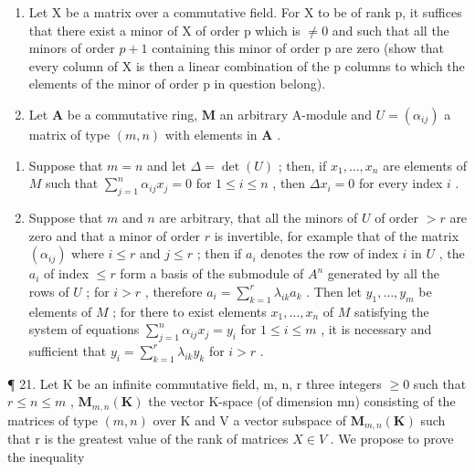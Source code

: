 \begin{enumerate}
\def\labelenumi{\arabic{enumi}.}
\setcounter{enumi}{18}
\item
  Let X be a matrix over a commutative field. For X to be of rank p, it suffices that there exist a minor of X of order p which is \(\neq0\) and such that all the minors of order \(p+1\) containing this minor of order p are zero (show that every column of X is then a linear combination of the p columns to which the elements of the minor of order p in question belong).
\item
  Let \(\mathbf{A}\) be a commutative ring, \(\mathbf{M}\) an arbitrary A-module and \(U = (\alpha_{ij})\) a matrix of type \((m, n)\) with elements in \(\mathbf{A}\) .
\end{enumerate}

\begin{enumerate}
\def\labelenumi{(\alph{enumi})}
\item
  Suppose that \(m = n\) and let \(\Delta = \det(U)\) ; then, if \(x_1, \ldots, x_n\) are elements of \(M\) such that \(\sum_{j=1}^{n} \alpha_{ij} x_j = 0\) for \(1 \leqslant i \leqslant n\) , then \(\Delta x_i = 0\) for every index \(i\) .
\item
  Suppose that \(m\) and \(n\) are arbitrary, that all the minors of \(U\) of order \(> r\) are zero and that a minor of order \(r\) is invertible, for example that of the matrix \((\alpha_{ij})\) where \(i \leqslant r\) and \(j \leqslant r\) ; then if \(a_i\) denotes the row of index \(i\) in \(U\) , the \(a_i\) of index \(\leqslant r\) form a basis of the submodule of \(A^n\) generated by all the rows of \(U\) ; for \(i > r\) , therefore \(a_i = \sum_{k=1}^{r} \lambda_{ik} a_k\) . Then let \(y_1, \ldots, y_m\) be elements of \(M\) ; for there to exist elements \(x_1, \ldots, x_n\) of \(M\) satisfying the system of equations \(\sum_{j=1}^{n} \alpha_{ij} x_j = y_i\) for \(1 \leqslant i \leqslant m\) , it is necessary and sufficient that \(y_i = \sum_{k=1}^{r} \lambda_{ik} y_k\) for \(i > r\) .
\end{enumerate}

¶ 21. Let K be an infinite commutative field, m, n, r three integers \(\geqslant0\) such that \(r\leqslant n\leqslant m\) , \(\mathbf{M}_{m,n}(\mathbf{K})\) the vector K-space (of dimension mn) consisting of the matrices of type \((m,n)\) over K and V a vector subspace of \(\mathbf{M}_{m,n}(\mathbf{K})\) such that r is the greatest value of the rank of matrices \(X\in V\) . We propose to prove the inequality

